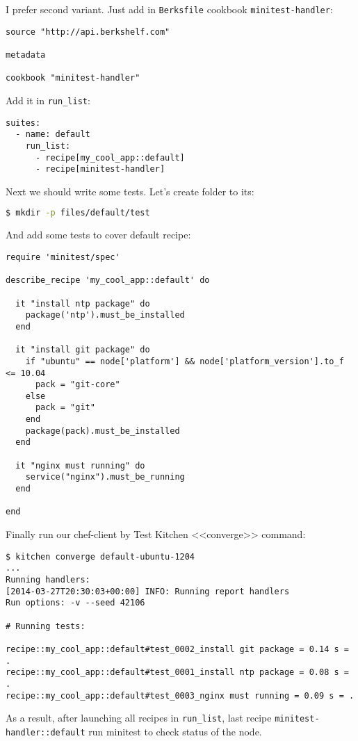 I prefer second variant. Just add in \lstinline!Berksfile! cookbook \lstinline!minitest-handler!:

\begin{lstlisting}[label=lst:testing-minitest5]
source "http://api.berkshelf.com"

metadata

cookbook "minitest-handler"
\end{lstlisting}

Add it in \lstinline!run_list!:

\begin{lstlisting}[label=lst:testing-minitest6]
suites:
  - name: default
    run_list:
      - recipe[my_cool_app::default]
      - recipe[minitest-handler]
\end{lstlisting}

Next we should write some tests. Let's create folder to its:

\begin{lstlisting}[language=Bash,label=lst:testing-minitest7]
$ mkdir -p files/default/test
\end{lstlisting}

And add some tests to cover default recipe:

\begin{lstlisting}[label=lst:testing-minitest8,title=my-server-cloud/site-cookbooks/my\_cool\_app/files/default/test/default\_test.rb]
require 'minitest/spec'

describe_recipe 'my_cool_app::default' do

  it "install ntp package" do
    package('ntp').must_be_installed
  end

  it "install git package" do
    if "ubuntu" == node['platform'] && node['platform_version'].to_f <= 10.04
      pack = "git-core"
    else
      pack = "git"
    end
    package(pack).must_be_installed
  end

  it "nginx must running" do
    service("nginx").must_be_running
  end

end
\end{lstlisting}

Finally run our chef-client by Test Kitchen <<converge>> command:

\begin{lstlisting}[label=lst:testing-minitest9]
$ kitchen converge default-ubuntu-1204
...
Running handlers:
[2014-03-27T20:30:03+00:00] INFO: Running report handlers
Run options: -v --seed 42106

# Running tests:

recipe::my_cool_app::default#test_0002_install git package = 0.14 s = .
recipe::my_cool_app::default#test_0001_install ntp package = 0.08 s = .
recipe::my_cool_app::default#test_0003_nginx must running = 0.09 s = .
\end{lstlisting}

As a result, after launching all recipes in \lstinline!run_list!, last recipe \lstinline!minitest-handler::default! run minitest to check status of the node.
